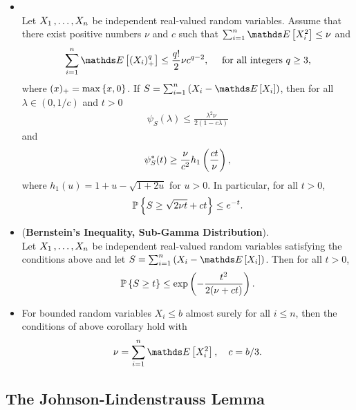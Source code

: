\documentclass[11pt]{article}
\begin{document}
\begin{itemize}
\item \begin{proposition}  \citep{boucheron2013concentration}\\
Let $X_1 \,{,}\ldots{,}\, X_n$ be independent real-valued random variables. Assume that there exist positive numbers  $\nu$ and $c$ such that
$\sum_{i=1}^{n}\E{}{X_i^2} \le \nu$ and
\begin{align*}
\sum_{i=1}^{n}\E{}{(X_i)_{+}^q} \le \frac{q!}{2} \nu c^{q-2}, \quad \text{ for all integers }q \ge 3,
\end{align*} where $(x)_{+} = \max\left\{x, 0\right\}$. If $S = \sum_{i=1}^{n}\paren{X_i - \E{}{X_i}}$, then for all $\lambda \in (0, 1/c)$ and $t > 0$
\begin{align*}
\psi_S(\lambda) \le \frac{\lambda^2 \nu}{2(1 - c\lambda)} 
\end{align*} and
\begin{align*}
\psi_S^{*}(t) \ge \frac{\nu}{c^2}h_1\left(\frac{ct}{\nu}\right),
\end{align*} where $h_1(u) = 1+ u - \sqrt{1 + 2u}$ for $u >0$. In particular, for all $t > 0$, 
\begin{align}
{\mathbb P}\left\{S \ge \sqrt{2\nu t} + ct \right\} \le e^{-t}. \label{ineqn: bernstein_inequality_gammar_dist_0}
\end{align}
\end{proposition}

\item \begin{corollary}(\textbf{Bernstein's Inequality, Sub-Gamma Distribution}).  \citep{boucheron2013concentration}\\
Let $X_1 \,{,}\ldots{,}\, X_n$ be independent real-valued random variables satisfying the conditions above and let $S = \sum_{i=1}^{n}\paren{X_i - \E{}{X_i}}$. Then for all $t > 0$,
\begin{align}
{\mathbb P}\left\{S \ge t \right\} \le \exp\left(- \frac{t^2}{2(\nu + ct)}\right).  \label{ineqn: bernstein_inequality_gammar_dist}
\end{align}
\end{corollary}

\item \begin{remark}
For bounded random variables $X_i \le b$ almost surely for all $i \le n$, then the conditions of above corollary hold with
\begin{align*}
\nu = \sum_{i=1}^{n}\E{}{X_i^2}, \quad c = b/3.
\end{align*}
\end{remark}
\end{itemize}

\subsection{The Johnson-Lindenstrauss Lemma}


\newpage


\end{document}
